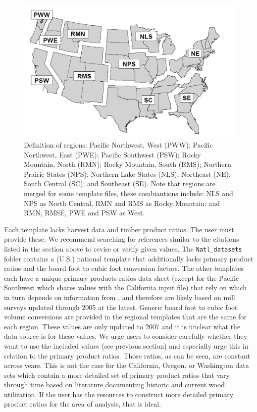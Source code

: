 \documentclass[
  openany]{book}
\begin{document}
\begin{figure}
\includegraphics[width=1\linewidth]{images/regions_map} \caption{Definition of regions: Pacific Northwest, West (PWW); Pacific Northwest, East (PWE); Pacific Southwest (PSW); Rocky Mountain, North (RMN); Rocky Mountain, South (RMS); Northern Prairie States (NPS); Northern Lake States (NLS); Northeast (NE); South Central (SC); and Southeast (SE).  Note that regions are merged for some template files, these combiantions include: NLS and NPS as North Central, RMN and RMS as Rocky Mountain; and RMN, RMSE, PWE and PSW as West.}\label{fig:template-map-fig}
\end{figure}

Each template lacks harvest data and timber product ratios. The user must provide these. We recommend searching for references similar to the citations listed in the section above to revise or verify given values. The \texttt{Natl\_datasets} folder contains a (U.S.) national template that additionally lacks primary product ratios and the board foot to cubic foot conversion factors. The other templates each have a unique primary products ratios data sheet (except for the Pacific Southwest which shares values with the California input file) that rely on \textcite{smith2006} which in turn depends on information from \textcite{adams2006}, and therefore are likely based on mill surveys updated through 2005 at the latest. Generic board foot to cubic foot volume conversions are provided in the regional templates that are the same for each region. These values are only updated to 2007 and it is unclear what the data source is for these values. We urge users to consider carefully whether they want to use the included values (see previous section) and especially urge this in relation to the primary product ratios. Those ratios, as can be seen, are constant across years. This is not the case for the California, Oregon, or Washington data sets which contain a more detailed set of primary product ratios that vary through time based on literature documenting historic and current wood utilization. If the user has the resources to construct more detailed primary product ratios for the area of analysis, that is ideal.
\end{document}
